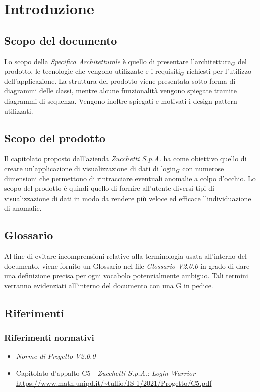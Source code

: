 \chapter{Introduzione}

\section{Scopo del documento}
Lo scopo della \textit{Specifica Architetturale} è quello di presentare l’architettura$_G$ del prodotto, le tecnologie che vengono utilizzate e i requisiti$_G$ richiesti per l'utilizzo dell'applicazione.  La struttura del prodotto viene presentata sotto forma di diagrammi delle classi, mentre alcune funzionalità vengono spiegate tramite diagrammi di sequenza. Vengono inoltre spiegati e motivati i design pattern utilizzati.

\section{Scopo del prodotto}
Il capitolato proposto dall'azienda \textit{Zucchetti S.p.A.} ha come obiettivo quello di creare un'applicazione di visualizzazione di dati di login$_G$ con numerose dimensioni che permettono
di rintracciare eventuali anomalie a colpo d'occhio. Lo scopo del prodotto è quindi quello di fornire all'utente diversi tipi di visualizzazione di dati in modo da rendere
più veloce ed efficace l'individuazione di anomalie.

\section{Glossario}
Al fine di evitare incomprensioni relative alla terminologia usata all'interno del documento, viene fornito un Glossario nel file \textit{Glossario V2.0.0} in grado di dare una definizione precisa per ogni vocabolo potenzialmente ambiguo. Tali termini verranno evidenziati all'interno del documento con una G in pedice.

\section{Riferimenti}
\subsection{Riferimenti normativi}
\begin{itemize}
    \item \textit{Norme di Progetto V2.0.0}
    \item Capitolato d'appalto C5 - \textit{Zucchetti S.p.A.}: \textit{Login Warrior} \\
    \url{https://www.math.unipd.it/~tullio/IS-1/2021/Progetto/C5.pdf}
\end{itemize}

